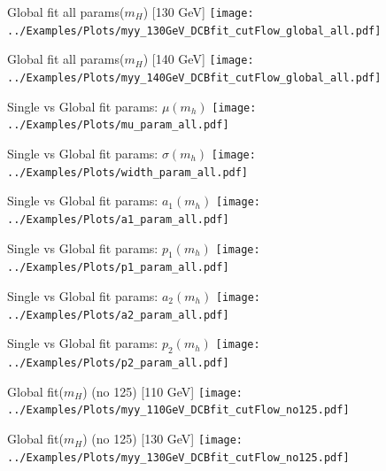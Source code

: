 \documentclass[10pt,UKenglish, leqno, xcolor = dvipsnames]{beamer}
\begin{document}
		\begin{frame}{Global fit all params($m_H$) [130 GeV]}
			\vfill
			\texttt{[image: ../Examples/Plots/myy\_130GeV\_DCBfit\_cutFlow\_global\_all.pdf]}
			\vfill
		\end{frame}
	
		\begin{frame}{Global fit all params($m_H$) [140 GeV]}
			\vfill
			\texttt{[image: ../Examples/Plots/myy\_140GeV\_DCBfit\_cutFlow\_global\_all.pdf]}
			\vfill
		\end{frame}
		
		\begin{frame}{Single vs Global fit params: $\mu(m_h)$}
			\vfill
			\texttt{[image: ../Examples/Plots/mu\_param\_all.pdf]}
			\vfill
		\end{frame}
		
		\begin{frame}{Single vs Global fit params: $\sigma(m_h)$}
			\vfill
			\texttt{[image: ../Examples/Plots/width\_param\_all.pdf]}
			\vfill
		\end{frame}
		
		\begin{frame}{Single vs Global fit params: $a_1(m_h)$}
			\vfill
			\texttt{[image: ../Examples/Plots/a1\_param\_all.pdf]}
			\vfill
		\end{frame}
		
		\begin{frame}{Single vs Global fit params: $p_1(m_h)$}
			\vfill
			\texttt{[image: ../Examples/Plots/p1\_param\_all.pdf]}
			\vfill
		\end{frame}
		
		\begin{frame}{Single vs Global fit params: $a_2(m_h)$}
			\vfill
			\texttt{[image: ../Examples/Plots/a2\_param\_all.pdf]}
			\vfill
		\end{frame}
		
		\begin{frame}{Single vs Global fit params: $p_2(m_h)$}
			\vfill
			\texttt{[image: ../Examples/Plots/p2\_param\_all.pdf]}
			\vfill
		\end{frame}
	
		\begin{frame}{Global fit($m_H$) (no 125) [110 GeV]}
			\vfill
			\texttt{[image: ../Examples/Plots/myy\_110GeV\_DCBfit\_cutFlow\_no125.pdf]}
			\vfill
		\end{frame}
		
		\begin{frame}{Global fit($m_H$) (no 125) [130 GeV]}
			\vfill
			\texttt{[image: ../Examples/Plots/myy\_130GeV\_DCBfit\_cutFlow\_no125.pdf]}
			\vfill
		\end{frame}
		
\end{document}
